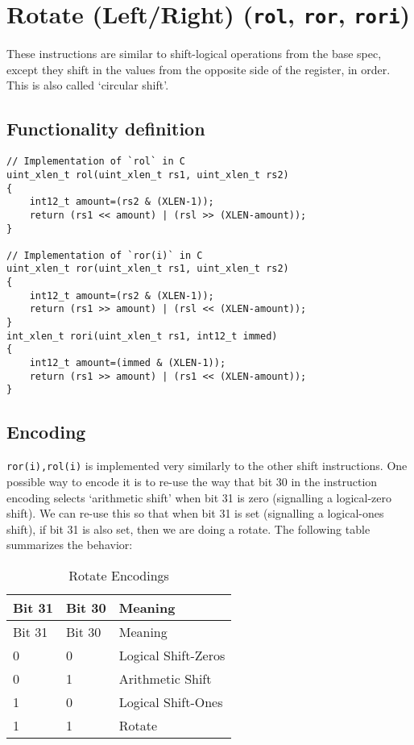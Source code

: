 
\section{Rotate (Left/Right) (\texttt{rol}, \texttt{ror}, \texttt{rori})}

These instructions are similar to shift-logical operations from the base
spec, except they shift in the values from the opposite side of the
register, in order. This is also called `circular shift'.

\subsection{Functionality definition}

\begin{verbatim}
// Implementation of `rol` in C
uint_xlen_t rol(uint_xlen_t rs1, uint_xlen_t rs2)
{
    int12_t amount=(rs2 & (XLEN-1));
    return (rs1 << amount) | (rsl >> (XLEN-amount));
}

// Implementation of `ror(i)` in C
uint_xlen_t ror(uint_xlen_t rs1, uint_xlen_t rs2)
{
    int12_t amount=(rs2 & (XLEN-1));
    return (rs1 >> amount) | (rsl << (XLEN-amount));
}
int_xlen_t rori(uint_xlen_t rs1, int12_t immed)
{
    int12_t amount=(immed & (XLEN-1));
    return (rs1 >> amount) | (rs1 << (XLEN-amount));
}
\end{verbatim}

\subsection{Encoding}



\texttt{ror(i),rol(i)} is implemented very similarly to the other shift
instructions. One possible way to encode it is to re-use the way that
bit 30 in the instruction encoding selects `arithmetic shift' when bit
31 is zero (signalling a logical-zero shift). We can re-use this so that
when bit 31 is set (signalling a logical-ones shift), if bit 31 is also
set, then we are doing a rotate. The following table summarizes the
behavior:

\begin{longtable}[c]{@{}lll@{}}
\caption{Rotate Encodings}\tabularnewline
\toprule
Bit 31 & Bit 30 & Meaning\tabularnewline
\midrule
\endfirsthead
\toprule
Bit 31 & Bit 30 & Meaning\tabularnewline
\midrule
\endhead
0 & 0 & Logical Shift-Zeros\tabularnewline
0 & 1 & Arithmetic Shift\tabularnewline
1 & 0 & Logical Shift-Ones\tabularnewline
1 & 1 & Rotate\tabularnewline
\bottomrule
\end{longtable}

